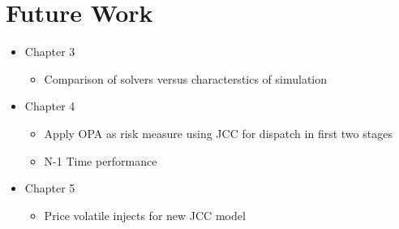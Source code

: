 
\chapter{Future Work}

\begin{itemize}
\item Chapter 3
\begin{itemize}
\item Comparison of solvers versus characterstics of simulation
\end{itemize}
\item Chapter 4
\begin{itemize}
\item Apply OPA as risk measure using JCC for dispatch in first two stages
\item N-1 Time performance
\end{itemize}
\item Chapter 5
\begin{itemize}
\item Price volatile injects for new JCC model
\end{itemize}
\end{itemize}


	
		
